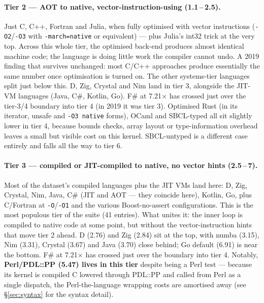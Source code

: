 \documentclass[11pt,a4paper]{article}
\begin{document}
\paragraph{Tier 2 --- AOT to native, vector-instruction-using (1.1\,--\,2.5).}
Just C, C++, Fortran and Julia, when fully optimised with vector
instructions (\verb|-O2|/\verb|-O3| with \verb|-march=native| or
equivalent) --- plus Julia's int32 trick at the very top. Across
this whole tier, the optimised back-end produces almost identical
machine code; the language is doing little work the compiler cannot
undo. A 2019 finding that survives unchanged: most C/C++ approaches
produce essentially the same number once optimisation is turned on.
The other systems-tier languages split just below this. D, Zig,
Crystal and Nim land in tier 3, alongside the JIT-VM languages
(Java, C\#, Kotlin, Go). F\# at 7.21$\times$ has crossed just over
the tier-3/4 boundary into tier 4 (in 2019 it was tier 3). Optimised
Rust (in its iterator,
unsafe and \verb|-O3 native| forms), OCaml and SBCL-typed all sit
slightly lower in tier 4, because bounds checks, array layout or
type-information overhead leaves a small but visible cost on this
kernel. SBCL-untyped is a different case entirely and falls all
the way to tier 6.

\paragraph{Tier 3 --- compiled or JIT-compiled to native, no vector hints (2.5\,--\,7).}
Most of the dataset's compiled languages plus the JIT VMs land here:
D, Zig, Crystal, Nim, Java, C\# (JIT and AOT --- they coincide here),
Kotlin, Go, plus C/Fortran at \verb|-O|/\verb|-O1| and the various
Boost-no-assert configurations. This is the most populous tier of the
suite (41 entries). What unites it: the inner loop is compiled to
native code at some point, but without the vector-instruction hints
that move tier 2 ahead. D (2.76) and Zig (2.84) sit at the top, with
numba (3.15), Nim (3.31), Crystal (3.67) and Java (3.70) close
behind; Go default (6.91) is near the bottom. F\# at 7.21$\times$
has crossed just over the boundary into tier 4. Notably, \textbf{Perl/PDL::PP
(5.47) lives in this tier} despite being a Perl test --- because
its kernel is compiled C lowered through PDL::PP and called from
Perl as a single dispatch, the Perl-the-language wrapping costs are
amortised away (see \S\ref{sec:syntax} for the syntax detail).
\end{document}
